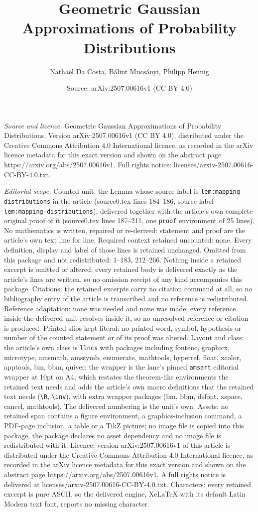 \documentclass[10pt,a4paper]{amsart}
\title[Geometric Gaussian Approximations of Probability Distributio]{Geometric Gaussian Approximations of Probability Distributions}
\author{Natha\"el Da Costa, B\'alint Mucs\'anyi, Philipp Hennig}
\date{Source: arXiv:2507.00616v1 (CC BY 4.0)}
\begin{document}
\maketitle

\noindent\emph{Source and licence.} Geometric Gaussian Approximations of Probability Distributions. Version arXiv:2507.00616v1 (CC BY 4.0), distributed under the Creative Commons Attribution 4.0 International licence, as recorded in the arXiv licence metadata for this exact version and shown on the abstract page https://arxiv.org/abs/2507.00616v1. Full rights notice: licenses/arxiv-2507.00616-CC-BY-4.0.txt.\par\smallskip

\noindent\textit{Editorial scope.} Counted unit: the Lemma whose source label is \texttt{lem:mapping-distributions} in the article (source0.tex lines 184--186, source label \texttt{lem:mapping-distributions}), delivered together with the article's own complete original proof of it (source0.tex lines 187--211, one \texttt{proof} environment of 25 lines). No mathematics is written, repaired or re-derived: statement and proof are the article's own text line for line. Required context retained uncounted: none. Every definition, display and label of those lines is retained unchanged. Omitted from this package and not redistributed: 1--183, 212--266. Nothing inside a retained excerpt is omitted or altered: every retained body is delivered exactly as the article's lines are written, so no omission receipt of any kind accompanies this package. Citations: the retained excerpts carry no citation command at all, so no bibliography entry of the article is transcribed and no reference is redistributed. Reference adaptation: none was needed and none was made; every reference inside the delivered unit resolves inside it, so no unresolved reference or citation is produced. Printed slips kept literal: no printed word, symbol, hypothesis or number of the counted statement or of its proof was altered. Layout and class: the article's own class is \texttt{llncs} with packages including fontenc, graphicx, microtype, amsmath, amssymb, enumerate, mathtools, hyperref, float, xcolor, apptools, bm, bbm, quiver; the wrapper is the lane's pinned \texttt{amsart} editorial wrapper at 10pt on A4, which restates the theorem-like environments the retained text needs and adds the article's own macro definitions that the retained text needs (\texttt{\textbackslash R}, \texttt{\textbackslash inv}), with extra wrapper packages (bm, bbm, dsfont, xspace, cancel, mathtools). The delivered numbering is the unit's own. Assets: no retained span contains a figure environment, a graphics-inclusion command, a PDF-page inclusion, a table or a TikZ picture; no image file is copied into this package, the package declares no asset dependency and no image file is redistributed with it. Licence: version arXiv:2507.00616v1 of this article is distributed under the Creative Commons Attribution 4.0 International licence, as recorded in the arXiv licence metadata for this exact version and shown on the abstract page https://arxiv.org/abs/2507.00616v1. A full rights notice is delivered at licenses/arxiv-2507.00616-CC-BY-4.0.txt. Characters: every retained excerpt is pure ASCII, so the delivered engine, XeLaTeX with its default Latin Modern text font, reports no missing character.
\end{document}
